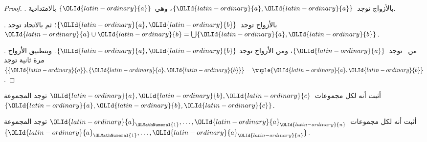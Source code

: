 \documentclass[../../../include/open-logic-section]{subfiles}
\begin{document}
\begin{proof}
. بالأزواج توجد~$\{{\OLId{latin-ordinary}{a}}, {\OLId{latin-ordinary}{a}}\}$، وهي~$\{{\OLId{latin-ordinary}{a}}\}$
بالامتدادية.

. بالأزواج توجد~$\{{\OLId{latin-ordinary}{a}}, {\OLId{latin-ordinary}{b}}\}$؛ ثم بالاتحاد توجد
${\OLId{latin-ordinary}{a}} \cup {\OLId{latin-ordinary}{b}} = \bigcup \{{\OLId{latin-ordinary}{a}}, {\OLId{latin-ordinary}{b}}\}$.

. من~ توجد~$\{{\OLId{latin-ordinary}{a}}\}$، ومن الأزواج توجد
$\{{\OLId{latin-ordinary}{a}},{\OLId{latin-ordinary}{b}}\}$. وبتطبيق الأزواج مرة ثانية توجد
$\{\{{\OLId{latin-ordinary}{a}}\}, \{{\OLId{latin-ordinary}{a}}, {\OLId{latin-ordinary}{b}}\}\} = \tuple{{\OLId{latin-ordinary}{a}}, {\OLId{latin-ordinary}{b}}}$.
\end{proof}

\begin{prob}
أثبت أنه لكل مجموعات~${\OLId{latin-ordinary}{a}},{\OLId{latin-ordinary}{b}},{\OLId{latin-ordinary}{c}}$ توجد المجموعة~$\{{\OLId{latin-ordinary}{a}},{\OLId{latin-ordinary}{b}},{\OLId{latin-ordinary}{c}}\}$.
\end{prob}

\begin{prob}
أثبت أنه لكل مجموعات~${\OLId{latin-ordinary}{a}}_{\OLMathNumeral{1}},\ldots,{\OLId{latin-ordinary}{a}}_{\OLId{latin-ordinary}{n}}$ توجد المجموعة
$\{{\OLId{latin-ordinary}{a}}_{\OLMathNumeral{1}},\ldots,{\OLId{latin-ordinary}{a}}_{\OLId{latin-ordinary}{n}}\}$.
\end{prob}

\end{document}
